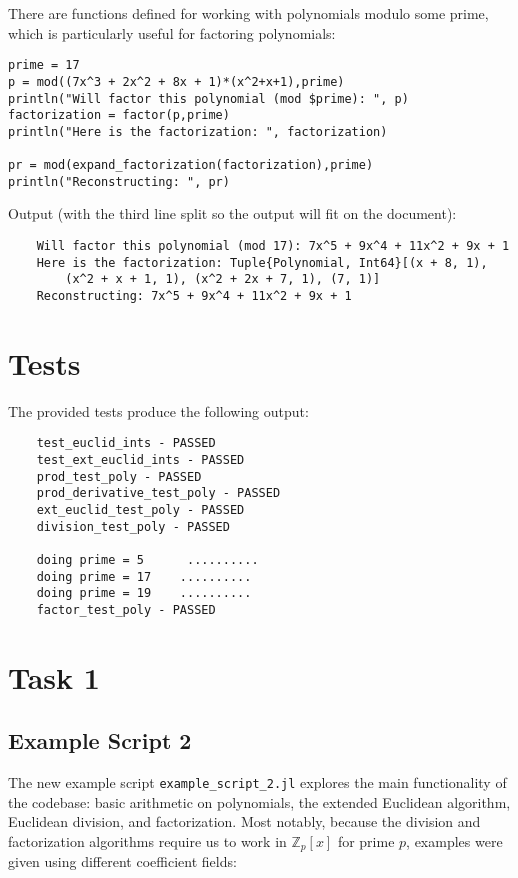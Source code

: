 \documentclass{article}
\theoremstyle{plain}
\numberwithin{theorem}{section}
\numberwithin{example}{section}
\theoremstyle{definition}
\numberwithin{definition}{section}
\begin{document}
There are functions defined for working with polynomials modulo some prime,
which is particularly useful for factoring polynomials:

\begin{codebox}
    \begin{Verbatim}
prime = 17
p = mod((7x^3 + 2x^2 + 8x + 1)*(x^2+x+1),prime)
println("Will factor this polynomial (mod $prime): ", p)
factorization = factor(p,prime)
println("Here is the factorization: ", factorization)

pr = mod(expand_factorization(factorization),prime)
println("Reconstructing: ", pr)
    \end{Verbatim}
\end{codebox}

Output (with the third line split so the output will fit on the document):
\begin{Verbatim}
    Will factor this polynomial (mod 17): 7x^5 + 9x^4 + 11x^2 + 9x + 1
    Here is the factorization: Tuple{Polynomial, Int64}[(x + 8, 1),
        (x^2 + x + 1, 1), (x^2 + 2x + 7, 1), (7, 1)]
    Reconstructing: 7x^5 + 9x^4 + 11x^2 + 9x + 1
\end{Verbatim}

\bigbreak

\section{Tests}
The provided tests produce the following output:
\begin{Verbatim}
    test_euclid_ints - PASSED
    test_ext_euclid_ints - PASSED
    prod_test_poly - PASSED
    prod_derivative_test_poly - PASSED
    ext_euclid_test_poly - PASSED
    division_test_poly - PASSED

    doing prime = 5 	 ..........
    doing prime = 17 	..........
    doing prime = 19 	..........
    factor_test_poly - PASSED
\end{Verbatim}

\bigbreak

\section{Task 1}
\subsection{Example Script 2}
The new example script \texttt{example\_script\_2.jl} explores the main
functionality of the codebase: basic arithmetic on polynomials, the extended
Euclidean algorithm, Euclidean division, and factorization. Most notably,
because the division and factorization algorithms require us to work in
$\mathbb{Z}_p[x]$ for prime $p$, examples were given using different coefficient
fields:
\end{document}
